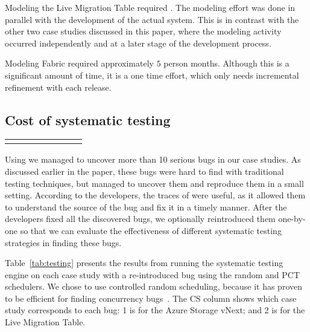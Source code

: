 Modeling the Live Migration Table required . The modeling effort was done in parallel with the development of the actual system. 
This is in contrast with the other two case studies discussed in this paper, where the modeling 
activity occurred independently and at a later stage of the development process.

Modeling Fabric required approximately $5$ person months. Although this is a
significant amount of time, it is a one time effort, which only needs incremental refinement with each release.

\subsection{Cost of systematic testing}
\label{sec:eval:machine_cost}

\setlength{\tabcolsep}{.72em}
\begin{table*}[t]
\small
\centering
\begin{tabular}{rl rrr rrr}
\centering

\end{tabular}
\caption{Results from running the \psharp random and PCT systematic testing schedulers for 100,000 iterations. We report: time in seconds to find a bug (Time to Bug); number of scheduling steps when a bug was found (\#SS); and if a bug was found with a particular scheduler (BF?).}
\label{tab:testing}
\end{table*}

Using \psharp we managed to uncover more than 10 serious bugs in our case studies. As discussed earlier in the paper, these bugs were hard to find with traditional testing techniques, but \psharp managed to uncover them and reproduce them in a small setting. According to the developers, the traces of \psharp were useful, as it allowed them to understand the source of the bug and fix it in a timely manner. After the developers fixed all the discovered bugs, we optionally reintroduced them one-by-one so that we can evaluate the effectiveness of different \psharp systematic testing strategies in finding these bugs.

Table~\ref{tab:testing} presents the results from running the \psharp systematic testing engine on each case study with a re-introduced bug using the random and PCT schedulers. We chose to use controlled random scheduling, because it has proven to be efficient for finding concurrency bugs~\cite{thomson2014sct, deligiannis2015psharp}. The CS column shows which case study corresponds to each bug: 1 is for the Azure Storage vNext; and 2 is for the Live Migration Table. 

